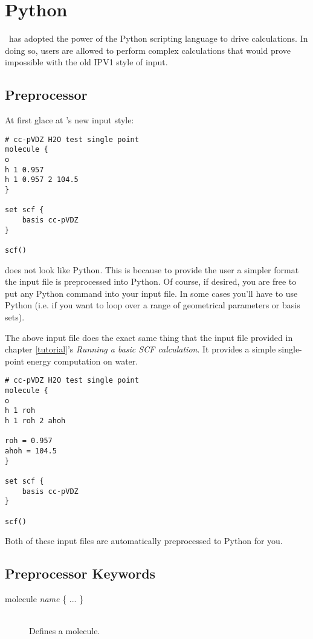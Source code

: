 \section{Python} \label{python}
\PSIfour\ has adopted the power of the Python scripting language
to drive calculations. In doing so, users are allowed to perform
complex calculations that would prove impossible with the old
IPV1 style of input.

\subsection{Preprocessor}
At first glace at \PSIfour 's new input style:
\begin{verbatim}
# cc-pVDZ H2O test single point
molecule {
o
h 1 0.957
h 1 0.957 2 104.5
}

set scf {
    basis cc-pVDZ
}

scf()
\end{verbatim}
does not look like Python. This is because to provide the user a simpler
format the input file is preprocessed into Python. Of course, if desired,
you are free to put any Python command into your input file. In some
cases you'll have to use Python (i.e. if you want to loop over a range of
geometrical parameters or basis sets).

The above input file does the exact same thing that the input file provided
in chapter \ref{tutorial}'s {\em Running a basic SCF calculation}. It provides
a simple single-point energy computation on water.

\begin{verbatim}
# cc-pVDZ H2O test single point
molecule {
o
h 1 roh
h 1 roh 2 ahoh

roh = 0.957
ahoh = 104.5
}

set scf {
    basis cc-pVDZ
}

scf()
\end{verbatim}

Both of these input files are automatically preprocessed to Python for you.

\subsection{Preprocessor Keywords}

\begin{description}
\item[molecule {\em name } \{ ... \}]\mbox{}\\
Defines a molecule.

\end{description}
